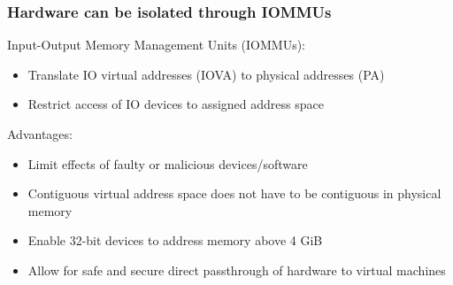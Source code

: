 % 
% 
% 
% 
%  

\begin{frame}
    \frametitle{Hardware can be isolated through IOMMUs}

    Input-Output Memory Management Units (IOMMUs):

    \begin{itemize}
        \item Translate IO virtual addresses (IOVA) to physical addresses (PA)
        \item Restrict access of IO devices to assigned address space
    \end{itemize}

    \vspace{1em}
    Advantages:

    \begin{itemize}
        \item Limit effects of faulty or malicious devices/software
        \item Contiguous virtual address space does not have to be contiguous in
            physical memory
        \item Enable 32-bit devices to address memory above 4 GiB
        \item Allow for safe and secure direct passthrough of hardware to virtual machines
    \end{itemize}
\end{frame}

